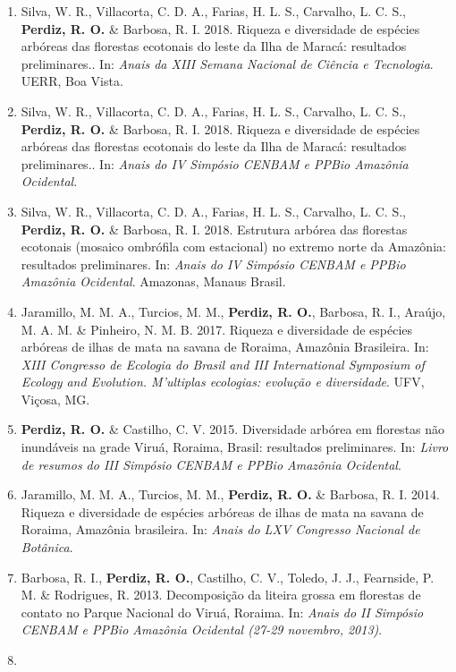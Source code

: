 \documentclass[11pt, a4paper]{awesome-cv}
\providecommand{\tightlist}{%
	\setlength{\itemsep}{0pt}\setlength{\parskip}{0pt}}
\begin{document}
\begin{enumerate}
\def\labelenumi{(\arabic{enumi})}
\tightlist
\item
  Silva, W. R., Villacorta, C. D. A., Farias, H. L. S., Carvalho, L. C. S., \textbf{Perdiz, R. O.} \& Barbosa, R. I. 2018. Riqueza e diversidade de espécies arbóreas das florestas ecotonais do leste da Ilha de Maracá: resultados preliminares.. In: \emph{Anais da XIII Semana Nacional de Ciência e Tecnologia}. UERR, Boa Vista.
\item
  Silva, W. R., Villacorta, C. D. A., Farias, H. L. S., Carvalho, L. C. S., \textbf{Perdiz, R. O.} \& Barbosa, R. I. 2018. Riqueza e diversidade de espécies arbóreas das florestas ecotonais do leste da Ilha de Maracá: resultados preliminares.. In: \emph{Anais do IV Simpósio CENBAM e PPBio Amazônia Ocidental}.
\item
  Silva, W. R., Villacorta, C. D. A., Farias, H. L. S., Carvalho, L. C. S., \textbf{Perdiz, R. O.} \& Barbosa, R. I. 2018. Estrutura arbórea das florestas ecotonais (mosaico ombrófila com estacional) no extremo norte da Amazônia: resultados preliminares. In: \emph{Anais do IV Simpósio CENBAM e PPBio Amazônia Ocidental}. Amazonas, Manaus Brasil.
\item
  Jaramillo, M. M. A., Turcios, M. M., \textbf{Perdiz, R. O.}, Barbosa, R. I., Araújo, M. A. M. \& Pinheiro, N. M. B. 2017. Riqueza e diversidade de espécies arbóreas de ilhas de mata na savana de Roraima, Amazônia Brasileira. In: \emph{XIII Congresso de Ecologia do Brasil and III International Symposium of Ecology and Evolution. M'ultiplas ecologias: evolução e diversidade}. UFV, Viçosa, MG.
\item
  \textbf{Perdiz, R. O.} \& Castilho, C. V. 2015. Diversidade arbórea em florestas não inundáveis na grade Viruá, Roraima, Brasil: resultados preliminares. In: \emph{Livro de resumos do III Simpósio CENBAM e PPBio Amazônia Ocidental}.
\item
  Jaramillo, M. M. A., Turcios, M. M., \textbf{Perdiz, R. O.} \& Barbosa, R. I. 2014. Riqueza e diversidade de espécies arbóreas de ilhas de mata na savana de Roraima, Amazônia brasileira. In: \emph{Anais do LXV Congresso Nacional de Botânica}.
\item
  Barbosa, R. I., \textbf{Perdiz, R. O.}, Castilho, C. V., Toledo, J. J., Fearnside, P. M. \& Rodrigues, R. 2013. Decomposição da liteira grossa em florestas de contato no Parque Nacional do Viruá, Roraima. In: \emph{Anais do II Simpósio CENBAM e PPBio Amazônia Ocidental (27-29 novembro, 2013)}.
\item

\end{enumerate}
\end{document}
